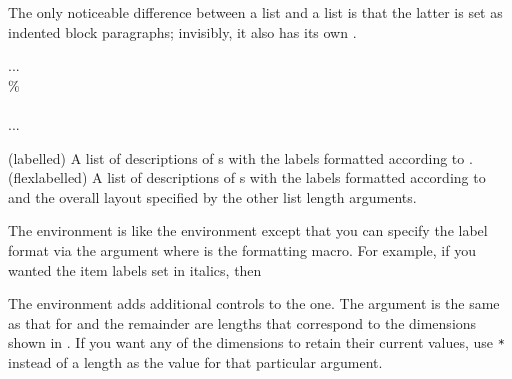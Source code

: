     The only noticeable difference between a  list and a 
 list is that the latter is set as indented block paragraphs;
invisibly, it also has its own \cmd{\blockdescriptionlabel}.

\begin{syntax}
 \cmd{\item} ...  \\
\% \\
                    \\
\cmd{\item} ...  \\
\end{syntax}
\glossary(labelled)%
  {}%
  {A list of descriptions of s with the labels formatted according to }.
\glossary(flexlabelled)%
  {}%
  {A list of descriptions of s with the labels formatted according to 
   and the overall layout specified by the other list length arguments.}

The  environment is like the  environment except that
you can specify the label format via the  argument where  is
the formatting macro. For example, if you wanted the item labels set in italics, then

    The  environment adds additional controls to the  one.
The  argument is the same as that for  and the remainder are
lengths that correspond to the dimensions shown in . If you want
any of the dimensions to retain their current values, use \verb?*? instead of a length
as the value for that particular argument.

